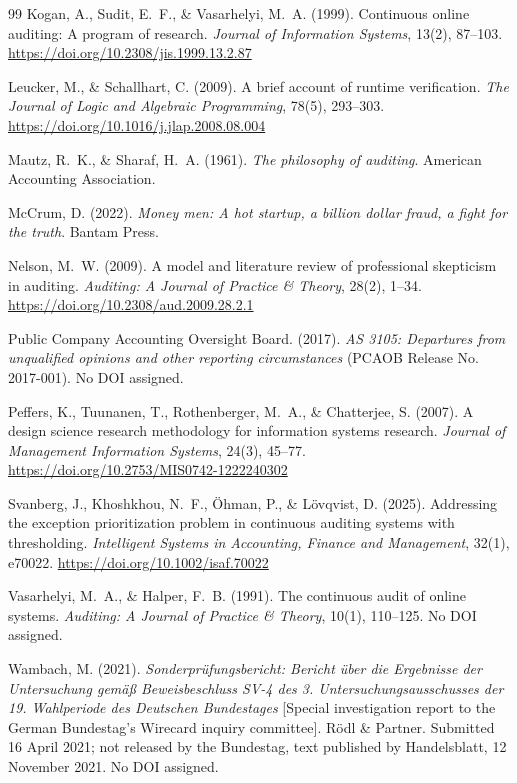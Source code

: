 \documentclass[11pt,a4paper]{article}
\theoremstyle{definition}
\theoremstyle{remark}
\begin{document}
\begin{thebibliography}{99}
Kogan, A., Sudit, E.~F., \& Vasarhelyi, M.~A. (1999).
Continuous online auditing: A program of research.
\emph{Journal of Information Systems}, 13(2), 87--103. \url{https://doi.org/10.2308/jis.1999.13.2.87}

Leucker, M., \& Schallhart, C. (2009).
A brief account of runtime verification.
\emph{The Journal of Logic and Algebraic Programming}, 78(5), 293--303. \url{https://doi.org/10.1016/j.jlap.2008.08.004}

Mautz, R.~K., \& Sharaf, H.~A. (1961).
\emph{The philosophy of auditing}. American Accounting Association.

McCrum, D. (2022).
\emph{Money men: A hot startup, a billion dollar fraud, a fight for the truth}. Bantam Press.

Nelson, M.~W. (2009).
A model and literature review of professional skepticism in auditing.
\emph{Auditing: A Journal of Practice \& Theory}, 28(2), 1--34. \url{https://doi.org/10.2308/aud.2009.28.2.1}

Public Company Accounting Oversight Board. (2017).
\emph{AS 3105: Departures from unqualified opinions and other reporting circumstances} (PCAOB Release No. 2017-001). No DOI assigned.

Peffers, K., Tuunanen, T., Rothenberger, M.~A., \& Chatterjee, S. (2007).
A design science research methodology for information systems research.
\emph{Journal of Management Information Systems}, 24(3), 45--77. \url{https://doi.org/10.2753/MIS0742-1222240302}

Svanberg, J., Khoshkhou, N.~F., \"{O}hman, P., \& L\"{o}vqvist, D. (2025).
Addressing the exception prioritization problem in continuous auditing systems with thresholding.
\emph{Intelligent Systems in Accounting, Finance and Management}, 32(1), e70022. \url{https://doi.org/10.1002/isaf.70022}

Vasarhelyi, M.~A., \& Halper, F.~B. (1991).
The continuous audit of online systems.
\emph{Auditing: A Journal of Practice \& Theory}, 10(1), 110--125. No DOI assigned.

Wambach, M. (2021).
\emph{Sonderpr\"{u}fungsbericht: Bericht \"{u}ber die Ergebnisse der Untersuchung gem\"{a}\ss{} Beweisbeschluss SV-4 des 3. Untersuchungsausschusses der 19. Wahlperiode des Deutschen Bundestages} [Special investigation report to the German Bundestag's Wirecard inquiry committee]. R\"{o}dl \& Partner. Submitted 16 April 2021; not released by the Bundestag, text published by Handelsblatt, 12 November 2021. No DOI assigned.

\end{thebibliography}
\end{document}

